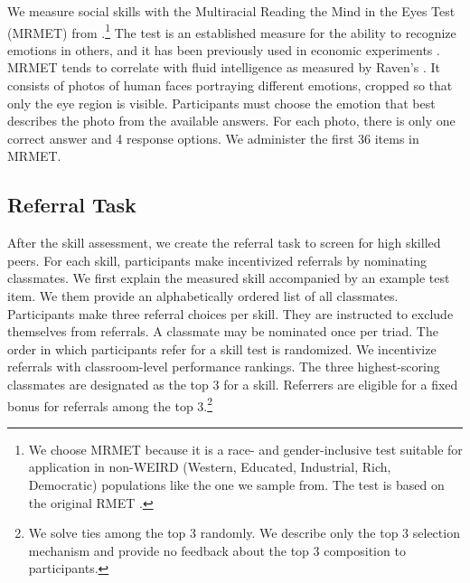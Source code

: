 \documentclass[11pt,a4paper,oneside]{article}
\begin{document}
We measure social skills with the Multiracial Reading the Mind in the Eyes Test (MRMET) from \citet{kim_multiracial_2022}.\footnote{We choose MRMET because it is a race- and gender-inclusive test suitable for application in non-WEIRD (Western, Educated, Industrial, Rich, Democratic) populations like the one we sample from. The test is based on the original RMET \citep{baron-cohen_reading_2001}.} The test is an established measure for the ability to recognize emotions in others, and it has been previously used in economic experiments \citep{van_leeuwen_predictably_2018, weidmann_team_2021,zarate2023uncovering}. MRMET tends to correlate with fluid intelligence as measured by Raven's \citep{alan2025empowering}. It consists of photos of human faces portraying different emotions, cropped so that only the eye region is visible. Participants must choose the emotion that best describes the photo from the available answers. For each photo, there is only one correct answer and 4 response options. We administer the first 36 items in MRMET.

\subsection{Referral Task} \label{referral_task}
After the skill assessment, we create the referral task to screen for high skilled peers. For each skill, participants make incentivized referrals by nominating classmates. We first explain the measured skill accompanied by an example test item. We them provide an alphabetically ordered list of all classmates. Participants make three referral choices per skill. They are instructed to exclude themselves from referrals. A classmate may be nominated once per triad. The order in which participants refer for a skill test is randomized. We incentivize referrals with classroom-level performance rankings. The three highest-scoring classmates are designated as the top 3 for a skill. Referrers are eligible for a fixed bonus for referrals among the top 3.\footnote{We solve ties among the top 3 randomly. We describe only the top 3 selection mechanism and provide no feedback about the top 3 composition to participants.} 
\end{document}
